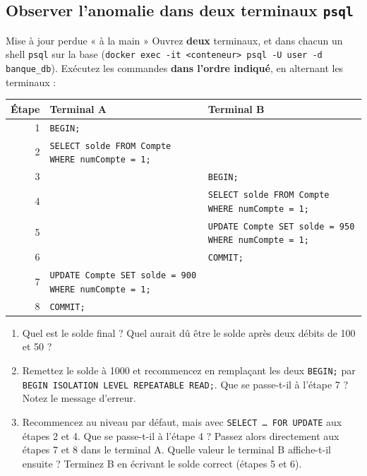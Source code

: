 \documentclass[11pt]{article}
\begin{document}
\subsection{Observer l'anomalie dans deux terminaux \texttt{psql}}

\begin{exobox}{Mise à jour perdue « à la main »}
Ouvrez \textbf{deux} terminaux, et dans chacun un shell \texttt{psql} sur la base
(\texttt{docker exec -it <conteneur> psql -U user -d banque\_db}). Exécutez les commandes
\textbf{dans l'ordre indiqué}, en alternant les terminaux :

\begin{center}
\begin{tabular}{@{}rll@{}}
\toprule
\textbf{Étape} & \textbf{Terminal A} & \textbf{Terminal B} \\
\midrule
1 & \texttt{BEGIN;} & \\
2 & \texttt{SELECT solde FROM Compte WHERE numCompte = 1;} & \\
3 & & \texttt{BEGIN;} \\
4 & & \texttt{SELECT solde FROM Compte WHERE numCompte = 1;} \\
5 & & \texttt{UPDATE Compte SET solde = 950 WHERE numCompte = 1;} \\
6 & & \texttt{COMMIT;} \\
7 & \texttt{UPDATE Compte SET solde = 900 WHERE numCompte = 1;} & \\
8 & \texttt{COMMIT;} & \\
\bottomrule
\end{tabular}
\end{center}

\begin{enumerate}[label=\alph*)]
  \item Quel est le solde final ? Quel aurait dû être le solde après deux débits de 100 et 50 ?
  \item Remettez le solde à 1000 et recommencez en remplaçant les deux \texttt{BEGIN;} par
        \texttt{BEGIN ISOLATION LEVEL REPEATABLE READ;}. Que se passe-t-il à l'étape 7 ?
        Notez le message d'erreur.
  \item Recommencez au niveau par défaut, mais avec \texttt{SELECT \ldots{} FOR UPDATE} aux étapes 2 et 4.
        Que se passe-t-il à l'étape 4 ? Passez alors directement aux étapes 7 et 8 dans le terminal A.
        Quelle valeur le terminal B affiche-t-il ensuite ? Terminez B en écrivant le solde correct (étapes 5 et 6).
\end{enumerate}
\end{exobox}
\end{document}
